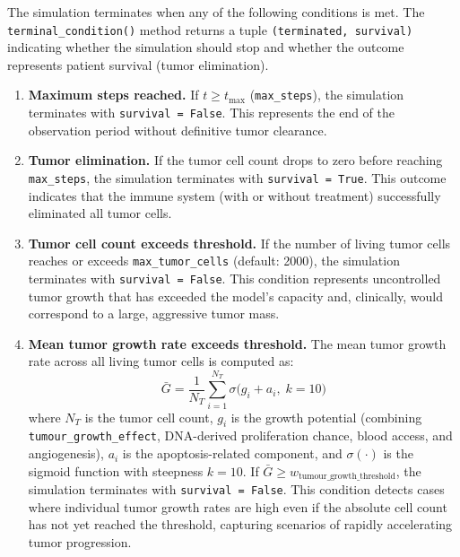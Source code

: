The simulation terminates when any of the following conditions is met. The \texttt{terminal\_condition()} method returns a tuple \texttt{(terminated, survival)} indicating whether the simulation should stop and whether the outcome represents patient survival (tumor elimination).

\begin{enumerate}
    \item \textbf{Maximum steps reached.} If $t \geq t_{\max}$ (\texttt{max\_steps}), the simulation terminates with \texttt{survival = False}. This represents the end of the observation period without definitive tumor clearance.

    \item \textbf{Tumor elimination.} If the tumor cell count drops to zero before reaching \texttt{max\_steps}, the simulation terminates with \texttt{survival = True}. This outcome indicates that the immune system (with or without treatment) successfully eliminated all tumor cells.

    \item \textbf{Tumor cell count exceeds threshold.} If the number of living tumor cells reaches or exceeds \texttt{max\_tumor\_cells} (default: 2000), the simulation terminates with \texttt{survival = False}. This condition represents uncontrolled tumor growth that has exceeded the model's capacity and, clinically, would correspond to a large, aggressive tumor mass.

    \item \textbf{Mean tumor growth rate exceeds threshold.} The mean tumor growth rate across all living tumor cells is computed as:
    \begin{equation}
        \bar{G} = \frac{1}{N_T} \sum_{i=1}^{N_T} \sigma\bigl(g_i + a_i,\; k=10\bigr)
        \label{eq:growth_rate}
    \end{equation}
    where $N_T$ is the tumor cell count, $g_i$ is the growth potential (combining \texttt{tumour\_growth\_effect}, DNA-derived proliferation chance, blood access, and angiogenesis), $a_i$ is the apoptosis-related component, and $\sigma(\cdot)$ is the sigmoid function with steepness $k = 10$. If $\bar{G} \geq w_{\text{tumour\_growth\_threshold}}$, the simulation terminates with \texttt{survival = False}. This condition detects cases where individual tumor growth rates are high even if the absolute cell count has not yet reached the threshold, capturing scenarios of rapidly accelerating tumor progression.
\end{enumerate}

